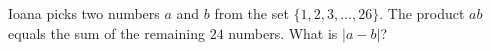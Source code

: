 Ioana picks two numbers $a$ and $b$ from the set $\{1,2,3,\dots,26\}$. The product $ab$ equals the sum of the remaining $24$ numbers. What is $|a-b|$?

